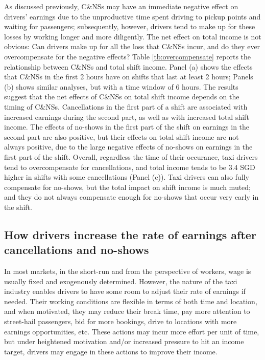 \documentclass[reviewmode]{AEA}
\begin{document}
As discussed previously, C\&NSs may have an immediate negative effect on drivers' earnings due to the unproductive time spent driving to pickup points and waiting for passengers; subsequently, however, drivers tend to make up for these losses by working longer and more diligently. The net effect on total income is not obvious: Can drivers make up for all the loss that C\&NSs incur, and do they ever overcompensate for the negative effects? Table \ref{tb:overcompensate} reports the relationship between C\&NSs and total shift income. Panel (a) shows the effects that C\&NSs in the first 2 hours have on shifts that last at least 2 hours; Panels (b) shows similar analyses, but with a time window of 6 hours. The results suggest that the net effects of C\&NSs on total shift income depends on the timing of C\&NSs. Cancellations in the first part of a shift are associated with increased earnings during the second part, as well as with increased total shift income. The effects of no-shows in the first part of the shift on earnings in the second part are also positive, but their effects on total shift income are not always positive, due to the large negative effects of no-shows on earnings in the first part of the shift. Overall, regardless the time of their occurance, taxi drivers tend to overcompensate for cancellations, and total income tends to be 3.4 SGD higher in shifts with some cancellations (Panel (c)). Taxi drivers can also fully compensate for no-shows, but the total impact on shift income is much muted; and they do not always compensate enough for no-shows that  occur very early in the shift. 

\subsection{How drivers increase the rate of earnings after cancellations and no-shows}
In most markets, in the short-run and from the perspective of workers, wage is usually fixed and exogenously determined. However, the nature of the taxi industry enables drivers to have some room to adjust their rate of earnings if needed. Their working conditions are flexible in terms of both time and location, and when motivated, they may reduce their break time, pay more attention to street-hail passengers, bid for more bookings, drive to locations with more earnings opportunities, etc. These actions may incur more effort per unit of time, but under heightened motivation and/or increased pressure to hit an income target, drivers may engage in these actions to improve their income.
\end{document}
